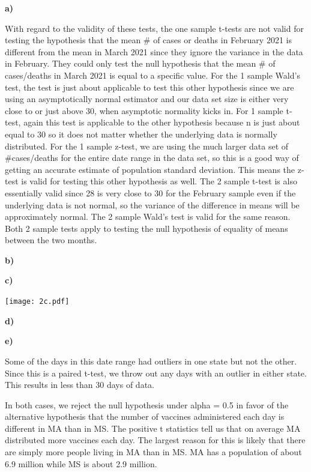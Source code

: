 \documentclass[12pt]{article}
\def\pp{\par\noindent}
\newcommand{\problem}[1]{\bigskip\pp\textbf{Part #1}\smallskip}
\renewcommand{\part}[1]{\smallskip\pp\textbf{#1)}\indent}
\begin{document}
\part{a}

\par With regard to the validity of these tests, the one sample
t-tests are not valid for testing the hypothesis that the mean \# of
cases or deaths in February 2021 is different from the mean in March
2021 since they ignore the variance in the data in February. They
could only test the null hypothesis that the mean \# of cases/deaths in
March 2021 is equal to a specific value. For the 1
sample Wald's test, the test is just about applicable to test this
other hypothesis since we are using an asymptotically normal estimator
and our data set size is either very close to or just above 30, when
asymptotic normality kicks in. For 1 sample t-test, again this test is
applicable to the other hypothesis because n is just about equal to 30
so it does not matter whether the underlying data is normally
distributed. For the 1 sample z-test, we are using the much larger
data set of \#cases/deaths for the entire date range in the data set,
so this is a good way of getting an accurate estimate of population
standard deviation. This means the z-test is valid for testing this
other hypothesis as well. The 2 sample t-test is also essentially
valid since 28 is very close to 30 for the February sample even if the
underlying data is not normal, so the variance of the difference in
means will be approximately normal. The 2 sample Wald's test is valid
for the same reason. Both 2 sample tests apply to testing the null
hypothesis of equality of means between the two months.
\part{b}

\part{c}

\pp\texttt{[image: 2c.pdf]}
\part{d}

\part{e}
\par Some of the days in this date range had outliers in one state but
not the other. Since this is a paired t-test, we throw out any days
with an outlier in either state. This results in less than 30 days of
data.

\par In both cases, we reject the null hypothesis under alpha = 0.5 in
favor of the alternative hypothesis that the number of vaccines
administered each day is different in MA than in MS. The positive t
statistics tell us that on average MA distributed more vaccines each
day. The largest reason for this is likely that there are simply more
people living in MA than in MS. MA has a population of about 6.9
million while MS is about 2.9 million.

\end{document}
